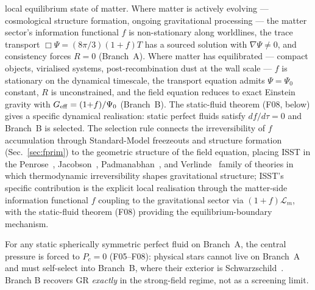 \documentclass[aps,prd,twocolumn,nofootinbib,floatfix,superscriptaddress]{revtex4-2}
\begin{document}
local equilibrium state of matter. Where matter is actively evolving
--- cosmological structure formation, ongoing gravitational
processing --- the matter sector's information functional $f$ is
non-stationary along worldlines, the trace transport
$\Box\Psi = (8\pi/3)(1{+}f)T$ has a sourced solution with
$\nabla\Psi \neq 0$, and consistency forces $R = 0$ (Branch~A).
Where matter has equilibrated --- compact objects, virialised
systems, post-recombination dust at the wall scale --- $f$ is
stationary on the dynamical timescale, the transport equation admits
$\Psi = \Psi_0$ constant, $R$ is unconstrained, and the field equation
reduces to exact Einstein gravity with
$G_{\rm eff} = (1{+}f)/\Psi_0$ (Branch~B). The static-fluid theorem
(F08, below) gives a specific dynamical realisation: static perfect
fluids satisfy $df/d\tau = 0$ and Branch~B is selected. The selection
rule connects the irreversibility of $f$ accumulation through
Standard-Model freezeouts and structure formation
(Sec.~\ref{sec:fprim}) to the geometric structure of the field
equation, placing ISST in the
Penrose~\cite{Penrose1979}, Jacobson~\cite{Jacobson1995},
Padmanabhan~\cite{Padmanabhan2010}, and Verlinde~\cite{Verlinde2011}
family of theories in which thermodynamic irreversibility shapes
gravitational structure; ISST's specific contribution is the explicit
local realisation through the matter-side information functional $f$
coupling to the gravitational sector via $(1{+}f)\mathcal L_m$, with
the static-fluid theorem (F08) providing the equilibrium-boundary
mechanism.

For any static spherically symmetric perfect fluid on Branch~A, the
central pressure is forced to $P_c=0$ (F05--F08): physical stars
cannot live on Branch~A and must self-select into Branch~B, where
their exterior is Schwarzschild~\cite{F03F08foundations}. Branch B
recovers GR \emph{exactly} in the strong-field regime, not as a
screening limit.
\end{document}
